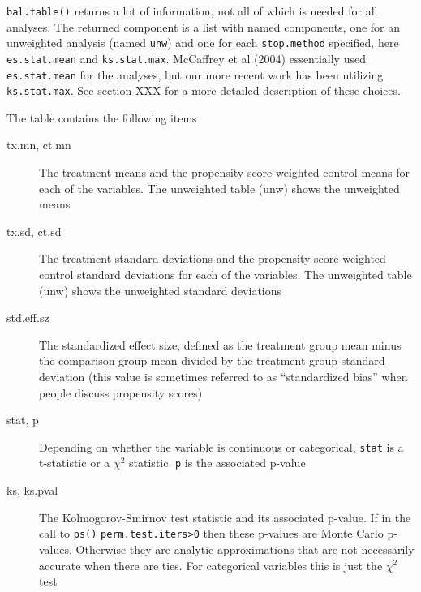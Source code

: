 \documentclass{article}
\begin{document}
\begin{Schunk}
\end{Schunk}


\texttt{bal.table()} returns a lot of information, not all of which is needed
for all analyses. The returned component is a list with named components, one
for an unweighted analysis (named \texttt{unw}) and one for each
\texttt{stop.method} specified, here \texttt{es.stat.mean} and
\texttt{ks.stat.max}. McCaffrey et al (2004) essentially used
\texttt{es.stat.mean} for the analyses, but our more recent work has been
utilizing \texttt{ks.stat.max}. See section XXX for a more detailed description
of these choices.

The table contains the following items
\begin{description}
\item[tx.mn, ct.mn] The treatment means and the propensity score weighted
control means for each of the variables. The unweighted table (unw) shows the
unweighted means
\item[tx.sd, ct.sd] The treatment standard deviations and the propensity score
weighted control standard deviations for each of the variables. The unweighted
table (unw) shows the unweighted standard deviations
\item[std.eff.sz] The standardized effect size, defined as the treatment group
mean minus the comparison group mean divided by the treatment group standard
deviation (this value is sometimes referred to as ``standardized bias'' when people discuss propensity scores) 
\item[stat, p] Depending on whether the variable is continuous or categorical,
\texttt{stat} is a t-statistic or a $\chi^2$ statistic. \texttt{p} is the
associated p-value
\item[ks, ks.pval] The Kolmogorov-Smirnov test statistic and its associated
p-value. If in the call to \texttt{ps()} \texttt{perm.test.iters>0} then these
p-values are Monte Carlo p-values. Otherwise they are analytic approximations
that are not necessarily accurate when there are ties. For categorical variables
this is just the $\chi^2$ test
\end{description}
\end{document}
